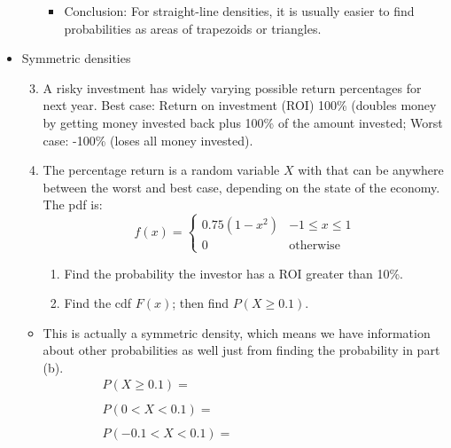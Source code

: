 \documentclass{article}
\begin{document}
\begin{itemize}
\begin{enumerate}
        \begin{itemize}
            \item Conclusion: For straight-line densities, it is usually easier to find probabilities as areas of trapezoids or triangles.
        \end{itemize}
    \end{enumerate}\newpage
    \item[] Symmetric densities
    \begin{enumerate}\setcounter{enumi}{2}
        \item A risky investment has widely varying possible return percentages for next year. Best case: Return on investment (ROI) 100\% (doubles money by getting money invested back plus 100\% of the amount invested; Worst case: -100\% (loses all money invested).
        \item[] The percentage return is a random variable $X$ with that can be anywhere between the worst and best case, depending on the state of the economy. The pdf is:
        \[
        f(x) =
            \left\{
            \begin{array}{ll}
                 0.75(1 - x^2) & -1 \le x \le 1\\
                 0 & \text{otherwise}
            \end{array}
            \right.
        \]
        \begin{enumerate}
            \item Find the probability the investor has a ROI greater than 10\%.\vspace{100pt}
            \item Find the cdf $F(x)$; then find $P(X \ge 0.1)$.\vspace{130pt}
        \end{enumerate}
    \end{enumerate}
    \begin{itemize}
        \item This is actually a symmetric density, which means we have information about other probabilities as well just from finding the probability in part (b).
        \begin{align*}
            &P(X \ge 0.1) = \hspace{200pt} \\\\
            &P(0 < X < 0.1) = \\\\
            &P(-0.1< X <  0.1) = \\\\

\end{align*}
\end{itemize}
\end{itemize}
\end{document}
